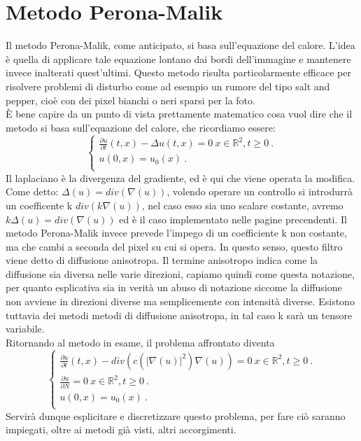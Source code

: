 \chapter{Metodo Perona-Malik}

Il metodo Perona-Malik, come anticipato, si basa sull'equazione del calore. L'idea è quella di applicare tale equazione lontano dai bordi dell'immagine e mantenere invece inalterati quest'ultimi.
Questo metodo risulta particolarmente efficace per risolvere problemi di disturbo come ad esempio un rumore del tipo salt and pepper, cioè con dei pixel bianchi o neri sparsi per la foto.\\
\vspace{1em}
\`E bene capire da un punto di vista prettamente matematico cosa vuol dire che il metodo si basa sull'equazione del calore, che ricordiamo essere:\\
\begin{equation} 
\begin{cases}
\frac{\partial u}{\partial t}(t,x)-\Delta u(t,x) = 0 \ x \in \mathbb R^2, t\ge 0 \ .\\ 
u(0,x) = u_0(x)\ . \\
\end{cases}
\end{equation}
Il laplaciano è la divergenza del gradiente, ed è qui che viene operata la modifica.
Come detto: $\Delta(u)=div(\nabla(u))$, volendo operare un controllo si introdurrà un coefficente k $div(k\nabla(u))$, nel caso esso sia uno scalare costante, avremo $k\Delta(u)=div(\nabla(u))$ ed è il caso implementato nelle pagine precendenti. Il metodo Perona-Malik invece prevede l'impego di un coefficiente k non costante, ma che cambi a seconda del pixel su cui si opera. In questo senso, questo filtro viene detto di diffusione anisotropa. Il termine anisotropo indica come la diffusione sia diversa nelle varie direzioni, capiamo quindi come questa notazione, per quanto esplicativa sia in verità un abuso di notazione siccome la diffusione non avviene in direzioni diverse ma semplicemente con intensità diverse. Esistono tuttavia dei metodi metodi di diffusione anisotropa, in tal caso k sarà un tensore variabile.\\
Ritornando al metodo in esame, il problema affrontato diventa\\
\begin{equation} 
\begin{cases}
\frac{\partial u}{\partial t}(t,x)-div(c(|\nabla(u)|^2)\nabla(u)) = 0 \ x \in \mathbb R^2, t\ge 0 \ .\\ 
\frac{\partial u}{\partial N}=0 \ x \in \mathbb R^2, t\ge 0 \ .\\ 
u(0,x) = u_0(x)\ . \\
\end{cases}
\end{equation}
Servirà dunque esplicitare e discretizzare questo problema, per fare ciò saranno impiegati, oltre ai metodi già visti, altri accorgimenti.\\


